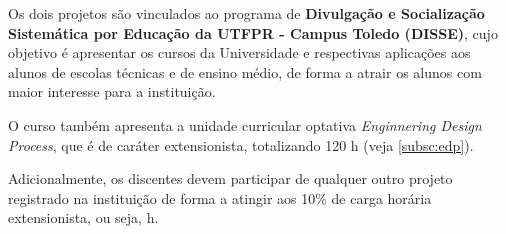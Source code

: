 Os dois projetos são vinculados ao programa de \textbf{Divulgação e Socialização Sistemática por Educação da UTFPR - Campus Toledo (DISSE)}, cujo objetivo é apresentar os cursos da Universidade e respectivas aplicações aos alunos de escolas técnicas e de ensino médio, de forma a atrair os alunos com maior interesse para a instituição.


O curso também apresenta a unidade curricular optativa \textit{Enginnering Design Process}, que é de caráter extensionista, totalizando 120 h (veja \autoref{subsc:edp}).

Adicionalmente, os discentes devem participar de qualquer outro projeto registrado na instituição de forma a atingir aos 10\% de carga horária extensionista, ou seja, h. 